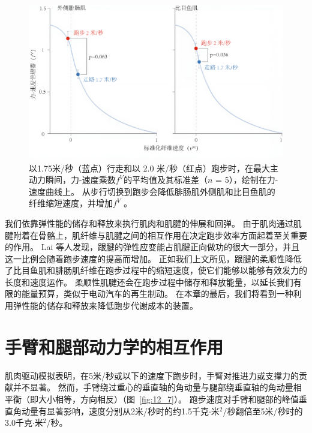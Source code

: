 \begin{figure}[!htb]
	\centering
	\includegraphics[width=0.9\linewidth]{chap12/12_6}
	\caption{以1.75米/秒（蓝点）行走和以 2.0 米/秒（红点）跑步时，在最大主动力瞬间，力-速度乘数$f^V$的平均值及其标准差（$n$ = 5），绘制在力-速度曲线上。
		从步行切换到跑步会降低腓肠肌外侧肌和比目鱼肌的纤维缩短速度，并增加$f^V$ \cite{arnold2013muscle}。 \label{fig:12_6}}
\end{figure}


我们依靠弹性能的储存和释放来执行肌肉和肌腱的伸展和回弹。
由于肌肉通过肌腱附着在骨骼上，肌纤维与肌腱之间的相互作用在决定跑步效率方面起着至关重要的作用。
Lai 等人\cite{lai2014tendon}发现，跟腱的弹性应变能占肌腱正向做功的很大一部分，并且这一比例会随着跑步速度的提高而增加。
正如我们上文所见，跟腱的柔顺性降低了比目鱼肌和腓肠肌纤维在跑步过程中的缩短速度，使它们能够以能够有效发力的长度和速度运作。
柔顺性肌腱还会在跑步过程中储存和释放能量，以延长我们有限的能量预算，类似于电动汽车的再生制动。
在本章的最后，我们将看到一种利用弹性能的储存和释放来降低跑步代谢成本的装置。


\section{手臂和腿部动力学的相互作用}

肌肉驱动模拟表明，在5米/秒或以下的速度下跑步时，手臂对推进力或支撑力的贡献并不显著。
然而，手臂绕过重心的垂直轴的角动量与腿部绕垂直轴的角动量相平衡（即大小相等，方向相反）（图~\ref{fig:12_7}）。
跑步速度对手臂和腿部的峰值垂直角动量有显著影响，速度分别从2米/秒时的约1.5千克$\cdot$米$^2$/秒翻倍至5米/秒时的3.0千克$\cdot$米$^2$/秒。



